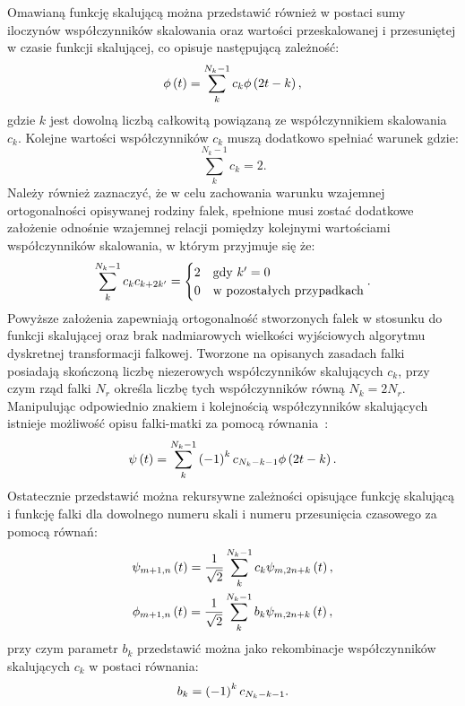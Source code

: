 Omawianą funkcję skalującą można przedstawić również w postaci sumy iloczynów współczynników skalowania oraz wartości przeskalowanej i przesuniętej w czasie funkcji skalującej, co opisuje następującą zależność:
\begin{equation}
\phi \left(t\right) = \sum _{k} ^{N_k-1} c_{k} \phi \left( 2t - k \right) \label{eq:dwt_scalefunrek},
\end{equation}
gdzie $k$ jest dowolną liczbą całkowitą powiązaną ze współczynnikiem skalowania $c_k$. Kolejne wartości współczynników $c_k$ muszą dodatkowo spełniać warunek gdzie:
\begin{equation}
\sum _{k} ^{N_k-1} c_{k} = 2 \label{eq:dwt_scalefunsum}.
\end{equation}
Należy również zaznaczyć, że w celu zachowania warunku wzajemnej ortogonalności opisywanej rodziny falek, spełnione musi zostać dodatkowe założenie odnośnie wzajemnej relacji pomiędzy kolejnymi wartościami współczynników skalowania, w którym przyjmuje się że:
\begin{equation}
\sum _{k} ^{N_k-1} c_{k} c_{k+2k'} =
\begin{cases}
	2 & $gdy$~k' = 0 \\
	0 & $w pozostałych przypadkach$
\end{cases}
\label{eq:dwt_scalemulort}.
\end{equation}
Powyższe założenia zapewniają ortogonalność stworzonych falek w stosunku do funkcji skalującej oraz brak nadmiarowych wielkości wyjściowych algorytmu dyskretnej transformacji falkowej. Tworzone na opisanych zasadach falki posiadają skończoną liczbę niezerowych współczynników skalujących $c_k$, przy czym rząd falki $N_r$ określa liczbę tych współczynników równą $N_{k} = 2 N_r$. Manipulując odpowiednio znakiem i kolejnością współczynników skalujących istnieje możliwość opisu falki-matki za pomocą równania~\cite{wallen_handbook}:
\begin{equation}
\psi \left(t\right) = \sum _{k} ^{N_k-1} \left(-1\right) ^{k} c_{N_k-k-1} \phi \left( 2t - k \right) \label{eq:dwt_waveletfunrek}.
\end{equation}
Ostatecznie przedstawić można rekursywne zależności opisujące funkcję skalującą i funkcję falki dla dowolnego numeru skali i numeru przesunięcia czasowego za pomocą równań:
\begin{gather}
\psi_{m+1,n} \left(t\right) = \frac{1}{\sqrt{2}} \sum _{k} ^{N_k-1} c_{k} \psi_{m,2n+k} \left(t\right) \label{eq:dwt_fatherrek}, \\
\phi_{m+1,n} \left(t\right) = \frac{1}{\sqrt{2}} \sum _{k} ^{N_k-1} b_{k} \psi_{m,2n+k} \left(t\right) \label{eq:dwt_matherrek},
\end{gather}
przy czym parametr $b_{k}$ przedstawić można jako rekombinacje współczynników skalujących $c_{k}$ w postaci równania:
\begin{equation}
b_{k} = \left(-1\right) ^{k} c_{N_k-k-1} \label{eq:dwt_bk}.
\end{equation}

